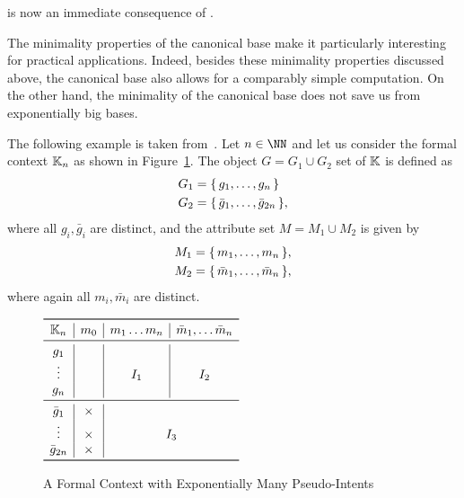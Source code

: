  is now an immediate consequence
of .

The minimality properties of the canonical base make it particularly interesting for
practical applications.  Indeed, besides these minimality properties discussed above, the
canonical base also allows for a comparably simple computation.  On the other hand, the
minimality of the canonical base does not save us from exponentially big bases.

\begin{Example}
  \label{expl:canonical-base-can-be-exponential}
  The following example is taken from~\cite{DBLP:journals/jucs/Kuznetsov04}.  Let $n \in
  \NN$ and let us consider the formal context ${\mathbb{K}}_n$ as shown in
  Figure~\ref{fig:expl-for-exponentially-many-pseudo-intents}.  The object $G = G_1 \cup
  G_2$ set of ${\mathbb{K}}$ is defined as
  \begin{align*}
    G_1 &= {\{\, g_1, \dots, g_n \,\}} \\
    G_2 &= {\{\, \bar g_1, \dots, \bar g_{2n} \,\}},
  \end{align*}
  where all $g_i, \bar g_i$ are distinct, and the attribute set $M = M_1 \cup M_2$ is
  given by
  \begin{align*}
    M_1 &= {\{\, m_1, \dots, m_n \,\}}, \\
    M_2 &= {\{\, \bar m_1, \dots, \bar m_n \,\}},
  \end{align*}
  where again all $m_i, \bar m_i$ are distinct.

  \begin{figure}[tp]
    \centering
    \begin{math}
      \begin{array}{c | c | c | c}
        \toprule
        \con K_n & m_0 & m_1 \dots m_n & \bar m_1, \dots \bar m_n \\
        \midrule
        g_1 & & & \\
        \vdots & & I_1 & I_2 \\
        g_n & & & \\
        \midrule
        \bar g_1   & \times & \multicolumn{2}{c}{} \\
        \vdots     & \times & \multicolumn{2}{c}{I_3} \\
        \bar g_{2n} & \times & \multicolumn{2}{c}{} \\
        \bottomrule
      \end{array}
    \end{math}
    \caption{A Formal Context with Exponentially Many Pseudo-Intents}
    \label{fig:expl-for-exponentially-many-pseudo-intents}
  \end{figure}


\end{Example}
